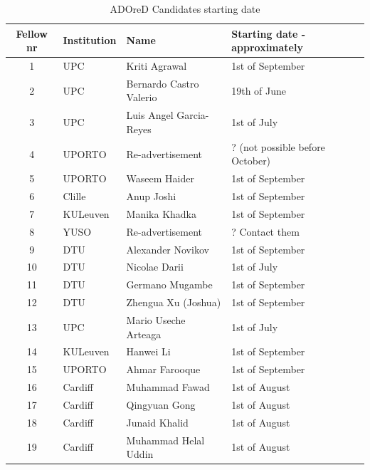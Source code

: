 \documentclass[a4paper,11pt, titlepage, twoside]{article}
\begin{document}
\begin{table}[H]
\caption{ADOreD Candidates starting date}
\centering
\begin{tabular}{clll}
\hline
\textbf{Fellow nr} & \textbf{Institution} & \textbf{Name}    & \textbf{Starting date - approximately} \\ \hline
1  & UPC      & Kriti Agrawal           & 1st of September \\
2  & UPC      & Bernardo Castro Valerio & 19th of June     \\
3  & UPC      & Luis Angel Garcia-Reyes & 1st of July      \\
4                                      & UPORTO                          & Re-advertisement & ? (not possible before October)        \\
5  & UPORTO   & Waseem Haider           & 1st of September \\
6  & Clille   & Anup Joshi              & 1st of September \\
7  & KULeuven & Manika Khadka           & 1st of September \\
8  & YUSO     & Re-advertisement        & ? Contact them   \\
9  & DTU      & Alexander Novikov       & 1st of September \\
10 & DTU      & Nicolae Darii           & 1st of July      \\
11 & DTU      & Germano Mugambe         & 1st of September \\
12 & DTU      & Zhengua Xu (Joshua)     & 1st of September \\
13 & UPC      & Mario Useche Arteaga    & 1st of July      \\
14 & KULeuven & Hanwei Li               & 1st of September \\
15 & UPORTO   & Ahmar Farooque          & 1st of September \\
16 & Cardiff  & Muhammad Fawad          & 1st of August    \\
17 & Cardiff  & Qingyuan Gong           & 1st of August    \\
18 & Cardiff  & Junaid Khalid           & 1st of August    \\
19 & Cardiff  & Muhammad Helal Uddin    & 1st of August    \\ \hline
\end{tabular}
\end{table}
\end{document}
